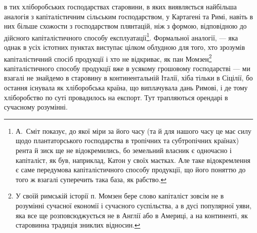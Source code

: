 \parcont{}  %
в тих хліборобських господарствах старовини, в яких виявляється найбільша
аналогія з капіталістичним сільським господарством, у Картагені та Римі,
навіть в них більше схожости з господарством плянтацій, ніж з формою, відповідною
до дійсного капіталістичного способу експлуатації\footnote{
А.~Сміт показує, до якої міри за його часу (та й для нашого часу це має силу щодо
плантаторського господарства в тропічних та субтропічних країнах) рента й зиск ще не відокремились,
бо земельний власник є одночасно і капіталіст, як був, наприклад, Катон у своїх маєтках. Але таке
відокремлення є саме передумова капіталістичного способу продукції, що його поняттю до того ж
взагалі суперечить така база, як рабство.
}. Формальної аналогії,
— яка однак в усіх істотних пунктах виступає цілком облудною для того,
хто зрозумів капіталістичний спосіб продукції і хто не відкриває, як пан Момзен\footnote{
У своїй римській історії п. Момзен бере слово капіталіст зовсім не в розумінні сучасної економії
і сучасного суспільства, а в дусі популярної уяви, яка все ще розповсюджується не в Англії або в
Америці, а на континенті, як старовинна традиція зниклих відносин.
}
капіталістичного способу продукції вже в усякому грошовому господарстві —
ми взагалі не знайдемо в старовину в континентальній Італії, хіба тільки в Сіцілії,
бо остання існувала як хліборобська країна, що виплачувала дань Римові,
і де тому хліборобство по суті провадилось на експорт. Тут трапляються орендарі
в сучасному розумінні.

